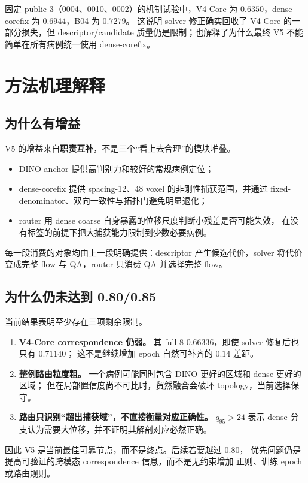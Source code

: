 \documentclass[11pt,a4paper]{ctexart}
\begin{document}
固定 public-3（0004、0010、0002）的机制试验中，V4-Core 为
$0.6350$，dense-corefix 为 $0.6944$，B04 为 $0.7279$。
这说明 solver 修正确实回收了 V4-Core 的一部分损失，但 descriptor/candidate
质量仍是限制；也解释了为什么最终 V5 不能简单在所有病例统一使用 dense-corefix。

\section{方法机理解释}

\subsection{为什么有增益}
V5 的增益来自\textbf{职责互补}，不是三个“看上去合理”的模块堆叠。
\begin{itemize}
  \item DINO anchor 提供高判别力和较好的常规病例定位；
  \item dense-corefix 提供 spacing-12、48 voxel 的非刚性捕获范围，并通过
        fixed-denominator、双向一致性与拓扑门避免明显退化；
  \item router 用 dense coarse 自身暴露的位移尺度判断小残差是否可能失效，
        在没有标签的前提下把大捕获能力限制到少数必要病例。
\end{itemize}
每一段消费的对象均由上一段明确提供：descriptor 产生候选代价，solver 将代价
变成完整 flow 与 QA，router 只消费 QA 并选择完整 flow。

\subsection{为什么仍未达到 0.80/0.85}
当前结果表明至少存在三项剩余限制。
\begin{enumerate}
  \item \textbf{V4-Core correspondence 仍弱。}
        其 full-8 $0.66336$，即使 solver 修复后也只有 $0.71140$；
        这不是继续增加 epoch 自然可补齐的 $0.14$ 差距。
  \item \textbf{整例路由粒度粗。}
        一个病例可能同时包含 DINO 更好的区域和 dense 更好的区域；
        但在局部置信度尚不可比时，贸然融合会破坏 topology，当前选择保守。
  \item \textbf{路由只识别“超出捕获域”，不直接衡量对应正确性。}
        $q_{95}>24$ 表示 dense 分支认为需要大位移，并不证明其解剖对应必然正确。
\end{enumerate}
因此 V5 是当前最佳可靠节点，而不是终点。后续若要越过 $0.80$，
优先问题仍是提高可验证的跨模态 correspondence 信息，而不是无约束增加
正则、训练 epoch 或路由规则。
\end{document}
